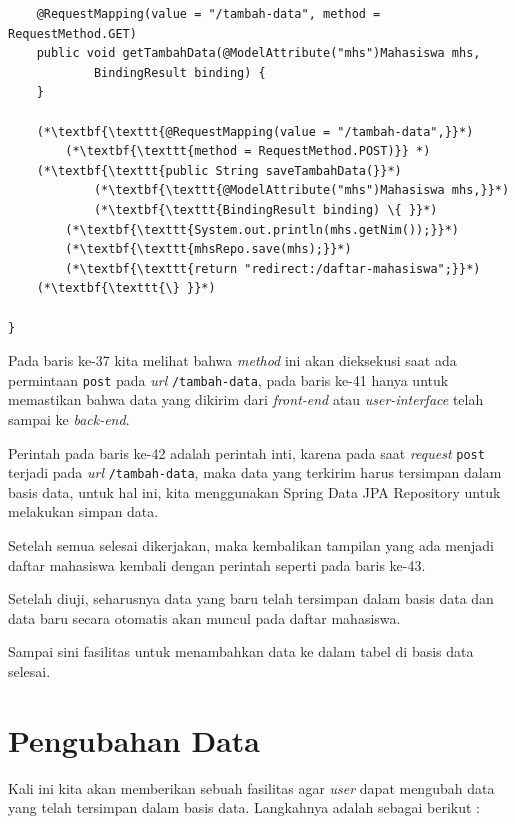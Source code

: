 \begin{enumerate}
\begin{lstlisting}
    @RequestMapping(value = "/tambah-data", method = RequestMethod.GET)
    public void getTambahData(@ModelAttribute("mhs")Mahasiswa mhs, 
            BindingResult binding) {
    }
    
    (*\textbf{\texttt{@RequestMapping(value = "/tambah-data",}}*)
        (*\textbf{\texttt{method = RequestMethod.POST)}} *)
    (*\textbf{\texttt{public String saveTambahData(}}*)
            (*\textbf{\texttt{@ModelAttribute("mhs")Mahasiswa mhs,}}*)
            (*\textbf{\texttt{BindingResult binding) \{ }}*)
        (*\textbf{\texttt{System.out.println(mhs.getNim());}}*)
        (*\textbf{\texttt{mhsRepo.save(mhs);}}*)
        (*\textbf{\texttt{return "redirect:/daftar-mahasiswa";}}*)
    (*\textbf{\texttt{\} }}*)
    
}
	\end{lstlisting}
	
	Pada baris ke-37 kita melihat bahwa \textit{method} ini akan dieksekusi saat ada permintaan \texttt{post} pada \textit{url} \texttt{/tambah-data}, pada baris ke-41 hanya untuk memastikan bahwa data yang dikirim dari \textit{front-end} atau \textit{user-interface} telah sampai ke \textit{back-end}.
	
	Perintah pada baris ke-42 adalah perintah inti, karena pada saat \textit{request} \texttt{post} terjadi pada \textit{url} \texttt{/tambah-data}, maka data yang terkirim harus tersimpan dalam basis data, untuk hal ini, kita menggunakan Spring Data JPA Repository untuk melakukan simpan data.
	
	Setelah semua selesai dikerjakan, maka kembalikan tampilan yang ada menjadi daftar mahasiswa kembali dengan perintah seperti pada baris ke-43.
	
	Setelah diuji, seharusnya data yang baru telah tersimpan dalam basis data dan data baru secara otomatis akan muncul pada daftar mahasiswa.
	
\end{enumerate}

Sampai sini fasilitas untuk menambahkan data ke dalam tabel di basis data selesai.

\section{Pengubahan Data}

Kali ini kita akan memberikan sebuah fasilitas agar \textit{user} dapat mengubah data yang telah tersimpan dalam basis data. Langkahnya adalah sebagai berikut :

